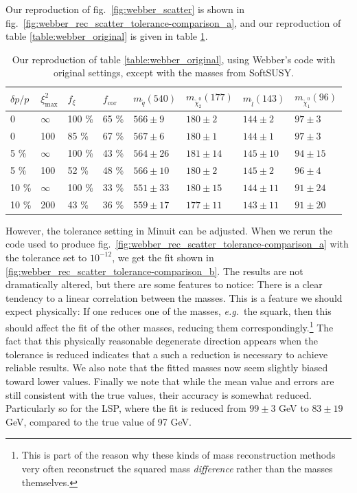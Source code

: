 \documentclass[twoside,english]{uiofysmaster}
\begin{document}
Our reproduction of fig.\ \ref{fig:webber_scatter} is shown in fig.\ \ref{fig:webber_rec_scatter_tolerance-comparison_a}, and our reproduction of table \ref{table:webber_original} is given in table \ref{table:webber_softsusy}.
\begin{table}[hbt]
	\centering
	\begin{tabular}{| l | l | l | l  || l | l | l | l |}
		\hline
		$\delta p/p$ & $\xi^2_\mathrm{max}$ & $f_\xi$ & $f_\mathrm{cor}$ & $m_{\tilde q} (540)$ & $m_{\tilde \chi_2^0} (177)$ & $m_{\tilde l} (143)$ & $m_{\tilde \chi_1^0} (96)$ \\
		\hline \hline
		0 & 	$\infty$ &	100 \%	& 65 \%	& $566 \pm 9$	&	$180 \pm 2$		&	$144 \pm 2$	& 	$97 \pm 3$	\\
		0 &		100 &		85 \%	& 67 \% & $567 \pm 6$	&	$180 \pm 1$		&	$144 \pm 1$	&	$97 \pm 3$	\\
		5 \% &	$\infty$ &	100 \%	& 43 \% & $564 \pm 26$	& 	$181 \pm 14$	&	$145 \pm 10$&	$94 \pm 15$ \\
		5 \% &	100 &		52 \%	& 48 \% & $566 \pm 10$	&	$180 \pm 2$		& 	$145 \pm 2$	&	$96 \pm 4$	\\
		10 \% &	$\infty$ &	100 \%	& 33 \% & $551 \pm 33$	&	$180 \pm 15$	&	$144 \pm 11$&	$91 \pm 24$	\\
		10 \% &	200 &		43 \%	& 36 \% & $559 \pm 17$	& 	$177 \pm 11$	&	$143 \pm 11$&	$91 \pm 20$ \\
		\hline
	\end{tabular}
	\caption{Our reproduction of table \ref{table:webber_original}, using Webber's code \cite{Webber:epost} with original settings, except with the masses from SoftSUSY.}
	\label{table:webber_softsusy}
\end{table}







However, the tolerance setting in {Minuit} can be adjusted. When we rerun the code used to produce fig.\ \ref{fig:webber_rec_scatter_tolerance-comparison_a} with the tolerance set to $10^{-12}$, we get the fit shown in \ref{fig:webber_rec_scatter_tolerance-comparison_b}. The results are not dramatically altered, but there are some features to notice: There is a clear tendency to a linear correlation between the masses. This is a feature we should expect physically: If one reduces one of the masses, {\it e.g.}\ the squark, then this should affect the fit of the other masses, reducing them correspondingly.\footnote{This is part of the reason why these kinds of mass reconstruction methods very often reconstruct the squared mass {\it difference} rather than the masses themselves.} The fact that this physically reasonable degenerate direction appears when the tolerance is reduced indicates that a such a reduction is necessary to achieve reliable results. We also note that the fitted masses now seem slightly biased toward lower values. Finally we note that while the mean value and errors are still consistent with the true values, their accuracy is somewhat reduced. Particularly so for the LSP, where the fit is reduced from $99 \pm 3$ GeV to $83 \pm 19$ GeV, compared to the true value of 97 GeV.
\end{document}
